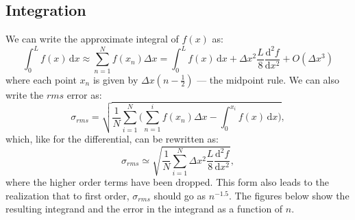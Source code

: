 \documentclass{scrartcl}
\begin{document}
\subsection{Integration}
We can write the approximate integral of $f(x)$ as:
\begin{equation}
	\int_{0}^{L}{f(x)\,\textrm{d} x}\approx\sum_{n=1}^{N}{f(x_{n})\Delta x}=\int_{0}^{L}{f(x)\,\textrm{d} x}+\Delta x^{2}\frac{L}{8}\frac{\textrm{d}^{2}f}{\textrm{d}x^{2}}+O(\Delta x^{3})
\end{equation}
where each point $x_{n}$ is given by $\Delta x(n-\frac{1}{2})$ --- the midpoint rule.
We can also write the $rms$ error as:
\begin{equation}
	\sigma_{rms}=\sqrt{\frac{1}{N}\sum_{i=1}^{N}{(\sum_{n=1}^{i}{f(x_{n})\Delta x}-\int_{0}^{x_{i}}{f(x)\,\textrm{d} x}})},
\end{equation}
which, like for the differential, can be rewritten as:
\begin{equation}
\sigma_{rms}\simeq\sqrt{\frac{1}{N}\sum_{i=1}^{N}{\Delta x^{2}\frac{L}{8}\frac{\textrm{d}^{2}f}{\textrm{d}x^{2}}}},
\end{equation}
where the higher order terms have been dropped.
This form also leads to the realization that to first order, $\sigma_{rms}$ should go as $n^{-1.5}$.
The figures below show the resulting integrand and the error in the integrand as a function of $n$.
\end{document}
